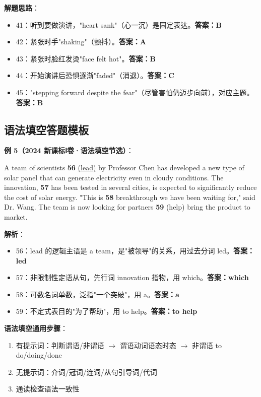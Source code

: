 \textbf{解题思路}：
\begin{itemize}
  \item 41：听到要做演讲，"heart sank"（心一沉）是固定表达。\textbf{答案：B}
  \item 42：紧张时手"shaking"（颤抖）。\textbf{答案：A}
  \item 43：紧张时脸红发烫"face felt hot"。\textbf{答案：B}
  \item 44：开始演讲后恐惧逐渐"faded"（消退）。\textbf{答案：C}
  \item 45："stepping forward despite the fear"（尽管害怕仍迈步向前），对应主题。\textbf{答案：B}
\end{itemize}

\subsection{语法填空答题模板}

\textbf{例 5（2024 新课标Ⅰ卷·语法填空节选）}：

A team of scientists \textbf{56} \underline{(lead)} by Professor Chen has developed a new type of solar panel that can generate electricity even in cloudy conditions. The innovation, \textbf{57} \underline{\hspace{1cm}} has been tested in several cities, is expected to significantly reduce the cost of solar energy. "This is \textbf{58} \underline{\hspace{1cm}} breakthrough we have been waiting for," said Dr. Wang. The team is now looking for partners \textbf{59} \underline{\hspace{1cm}} (help) bring the product to market.

\textbf{解析}：
\begin{itemize}
  \item 56：lead 的逻辑主语是 a team，是"被领导"的关系，用过去分词 led。\textbf{答案：led}
  \item 57：非限制性定语从句，先行词 innovation 指物，用 which。\textbf{答案：which}
  \item 58：可数名词单数，泛指"一个突破"，用 a。\textbf{答案：a}
  \item 59：不定式表目的"为了帮助"，用 to help。\textbf{答案：to help}
\end{itemize}

\textbf{语法填空通用步骤}：
\begin{enumerate}
  \item 有提示词：判断谓语/非谓语 $\to$ 谓语动词语态时态 $\to$ 非谓语 to do/doing/done
  \item 无提示词：介词/冠词/连词/从句引导词/代词
  \item 通读检查语法一致性
\end{enumerate}

